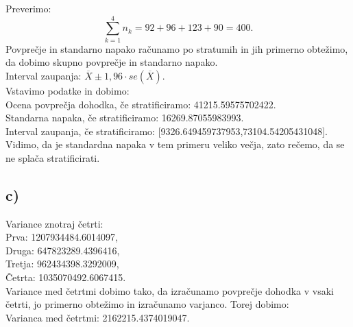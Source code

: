 \documentclass{article}
\begin{document}
Preverimo:
\begin{equation*}
\sum_{k=1}^{4}n_k = 92+96+123+90 = 400.
\end{equation*}
Povprečje in standarno napako računamo po stratumih in jih primerno obtežimo, da dobimo skupno povprečje in standarno napako.\\
Interval zaupanja: $\overline{X} \pm 1,96 \cdot se(\overline{X})$. \\
Vstavimo podatke in dobimo:\\
Ocena povprečja dohodka, če stratificiramo: 41215.59575702422.\\
Standarna napaka, če stratificiramo: 16269.87055983993.\\
Interval zaupanja, če stratificiramo: [9326.649459737953,73104.54205431048].\\
Vidimo, da je standardna napaka v tem primeru veliko večja, zato rečemo, da se ne splača stratificirati.

\subsection*{c)}
Variance znotraj četrti:\\
 Prva: 1207934484.6014097, \\
 Druga: 647823289.4396416, \\
 Tretja: 962434398.3292009, \\
 Četrta: 1035070492.6067415.\\
Variance med četrtmi dobimo tako, da izračunamo povprečje dohodka v vsaki četrti, jo primerno obtežimo in izračunamo varjanco. Torej dobimo:\\
Varianca med četrtmi: 2162215.4374019047.
\end{document}
